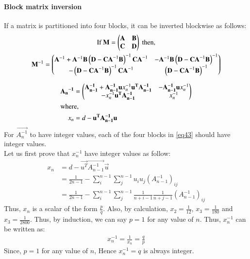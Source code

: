 \documentclass[journal,12pt,twocolumn]{IEEEtran}
\begin{document}
\begin{mdframed}
\textbf{Block matrix inversion} \\ \\
If a matrix is partitioned into four blocks, it can be inverted blockwise as follows:
{\scriptsize 
\begin{gather}
    \text{If } \mathbf{M}=
    \begin{pmatrix}\mathbf{A} &\mathbf{B} \\\mathbf{C} &\mathbf{D}\end{pmatrix} \text{ then,} \nonumber \\
    \mathbf{M}^{-1}=\begin{pmatrix}\mathbf {A} ^{-1}+\mathbf {A} ^{-1}\mathbf {B} \left(\mathbf {D} -\mathbf {CA} ^{-1}\mathbf {B} \right)^{-1}\mathbf {CA} ^{-1}&-\mathbf {A} ^{-1}\mathbf {B} \left(\mathbf {D} -\mathbf {CA} ^{-1}\mathbf {B} \right)^{-1}\\-\left(\mathbf {D} -\mathbf {CA} ^{-1}\mathbf {B} \right)^{-1}\mathbf {CA} ^{-1}&\left(\mathbf {D} -\mathbf {CA} ^{-1}\mathbf {B} \right)^{-1}\end{pmatrix}
\end{gather}
}%
\end{mdframed}
\begin{align}
    \mathbf{{A_n}^{-1}} &= \begin{pmatrix}\mathbf{A_{n-1}^{-1}}+\mathbf{A_{n-1}^{-1}}\mathbf{u}x_n^{-1}\mathbf{u^T}\mathbf{A_{n-1}^{-1}} & -\mathbf{A_{n-1}^{-1}}\mathbf{u}x_n^{-1}\\-x_n^{-1}\mathbf{u^T}\mathbf{A_{n-1}^{-1}} & x_n^{-1}\end{pmatrix}\label{eq43}\\
\intertext{where,}
x_n &= d-\mathbf{u^T}\mathbf{A_{n-1}^{-1}}\mathbf{u}
\end{align}
For $\vec{A_{n}^{-1}}$ to have integer values, each of the four blocks in \eqref{eq43} should have integer values.\\
Let us first prove that $x_n^{-1}$ have integer values as follow:
\begin{align}
    x_n &= d-\vec{u^T}\vec{A_{n-1}^{-1}}\vec{u}\\
    &=\frac{1}{2n-1}-\sum_i ^{n-1}\sum_j^{n-1} u_iu_j (A_{n-1}^{-1})_{ij}\\
    &=\frac{1}{2n-1}-\sum_i ^{n-1}\sum_j^{n-1} \frac{1}{n+i-1}\frac{1}{n+j-1}(A_{n-1}^{-1})_{ij}
\end{align}
Thus, $x_n$ is a scalar of the form $\frac{p}{q}$. Also, by calculation, $x_2=\frac{1}{12}$, $x_3=\frac{1}{180}$ and $x_3=\frac{1}{2800}$. Thus, by induction, we can say $p=1$ for any value of $n$. Thus, $x_n^{-1}$ can be written as:
\begin{align}
    x_n^{-1}=\frac{1}{x_n}=\frac{q}{p}
\end{align}
Since, $p=1$ for any value of $n$, Hence $x_n^{-1}=q$ is always integer.\\ \\
\end{document}
